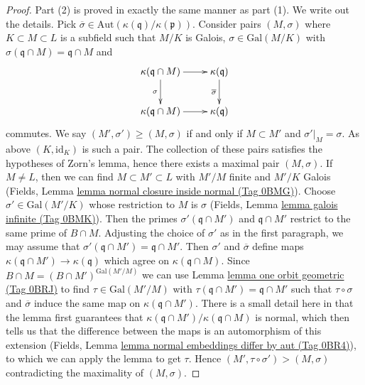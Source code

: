 \documentclass{amsart}
\theoremstyle{plain}
\theoremstyle{definition}
\theoremstyle{remark}
\numberwithin{equation}{subsection}
\begin{document}
\begin{proof}
\medskip\noindent
Part (2) is proved in exactly the same manner as part (1). We
write out the details. Pick
$\overline{\sigma} \in \text{Aut}(\kappa(\mathfrak q)/\kappa(\mathfrak p))$.
Consider pairs $(M, \sigma)$ where $K \subset M \subset L$
is a subfield such that $M/K$ is Galois, $\sigma \in \text{Gal}(M/K)$
with $\sigma(\mathfrak q \cap M) = \mathfrak q \cap M$ and
$$
\xymatrix{
\kappa(\mathfrak q \cap M) \ar[r] \ar[d]_\sigma &
\kappa(\mathfrak q) \ar[d]_{\overline{\sigma}} \\
\kappa(\mathfrak q \cap M) \ar[r] & \kappa(\mathfrak q)
}
$$
commutes. We say $(M', \sigma') \geq (M, \sigma)$ if and only if
$M \subset M'$ and $\sigma'|_M = \sigma$.
As above $(K, \text{id}_K)$ is such a pair.
The collection of these pairs satisfies the hypotheses of Zorn's lemma,
hence there exists a maximal pair $(M, \sigma)$.
If $M \not = L$, then we can find
$M \subset M' \subset L$ with $M'/M$ finite and $M'/K$ Galois
(Fields, Lemma \href{https://stacks.math.columbia.edu/tag/0BMG}{lemma normal closure inside normal (Tag 0BMG)}).
Choose $\sigma' \in \text{Gal}(M'/K)$ whose restriction to $M$
is $\sigma$ (Fields, Lemma \href{https://stacks.math.columbia.edu/tag/0BMK}{lemma galois infinite (Tag 0BMK)}).
Then the primes $\sigma'(\mathfrak q \cap M')$ and $\mathfrak q \cap M'$
restrict to the same prime of $B \cap M$. Adjusting the choice
of $\sigma'$ as in the first paragraph, we may assume that
$\sigma'(\mathfrak q \cap M') = \mathfrak q \cap M'$.
Then $\sigma'$ and $\overline{\sigma}$ define maps
$\kappa(\mathfrak q \cap M') \to \kappa(\mathfrak q)$
which agree on $\kappa(\mathfrak q \cap M)$. Since
$B \cap M = (B \cap M')^{\text{Gal}(M'/M)}$ we can
use Lemma \href{https://stacks.math.columbia.edu/tag/0BRJ}{lemma one orbit geometric (Tag 0BRJ)}
to find $\tau \in \text{Gal}(M'/M)$ with
$\tau(\mathfrak q \cap M') = \mathfrak q \cap M'$
such that $\tau \circ \sigma$ and $\overline{\sigma}$
induce the same map on $\kappa(\mathfrak q \cap M')$.
There is a small detail here in that the lemma first
guarantees that $\kappa(\mathfrak q \cap M')/\kappa(\mathfrak q \cap M)$
is normal, which then tells us that the difference between
the maps is an automorphism of this extension
(Fields, Lemma \href{https://stacks.math.columbia.edu/tag/0BR4}{lemma normal embeddings differ by aut (Tag 0BR4)}),
to which we can
apply the lemma to get $\tau$. Hence $(M', \tau \circ \sigma') > (M, \sigma)$
contradicting the maximality of $(M, \sigma)$.
\end{proof}
\end{document}
